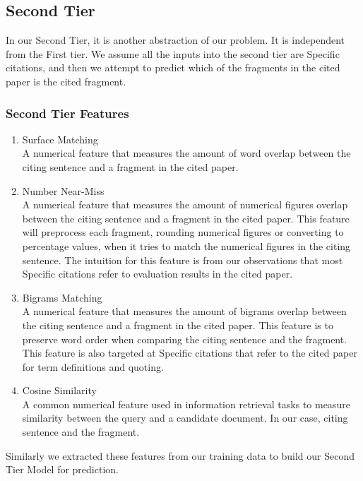 \subsection{Second Tier}
In our Second Tier, it is another abstraction of our problem. It is independent from the First tier. We assume all the inputs into the second tier are Specific citations, and then we attempt to predict which of the fragments in the cited paper is the cited fragment.

\subsubsection{Second Tier Features}
\begin{enumerate}
\item Surface Matching \\
A numerical feature that measures the amount of word overlap between the citing sentence and a fragment in the cited paper.

\item Number Near-Miss \\
A numerical feature that measures the amount of numerical figures overlap between the citing sentence and a fragment in the cited paper. This feature will preprocess each fragment, rounding numerical figures or converting to percentage values, when it tries to match the numerical figures in the citing sentence. The intuition for this feature is from our observations that most Specific citations refer to evaluation results in the cited paper.

\item Bigrams Matching \\
A numerical feature that measures the amount of bigrams overlap between the citing sentence and a fragment in the cited paper. This feature is to preserve word order when comparing the citing sentence and the fragment. This feature is also targeted at Specific citations that refer to the cited paper for term definitions and quoting.

\item Cosine Similarity \\
A common numerical feature used in information retrieval tasks to measure similarity between the query and a candidate document. In our case, citing sentence and the fragment.
\end{enumerate}
Similarly we extracted these features from our training data to build our Second Tier Model for prediction.